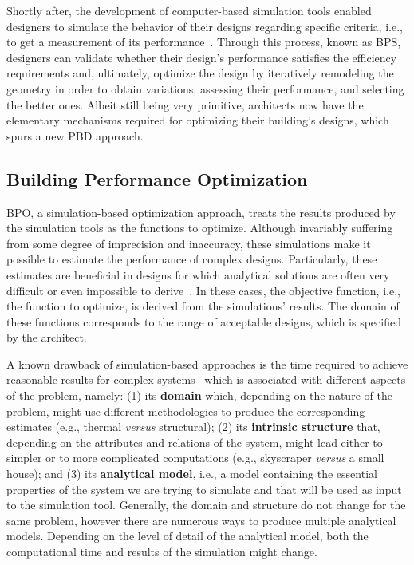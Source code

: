 Shortly after, the development of computer-based simulation tools enabled designers to simulate the behavior of their designs regarding specific criteria, i.e., to get a measurement of its performance~\cite{Malkawi2005}. Through this process, known as \ac{BPS}, designers can validate whether their design's performance satisfies the efficiency requirements and, ultimately, optimize the design by iteratively remodeling the geometry in order to obtain variations, assessing their performance, and selecting the better ones. Albeit still being very primitive, architects now have the elementary mechanisms required for optimizing their building's designs, which spurs a new \ac{PBD} approach.

\subsection{Building Performance Optimization}

	\ac{BPO}, a simulation-based optimization approach, treats the results produced by the simulation tools as the functions to optimize. Although invariably suffering from some degree of imprecision and inaccuracy, these simulations make it possible to estimate the performance of complex designs. Particularly, these estimates are beneficial in designs for which analytical solutions are often very difficult or even impossible to derive~\cite{Kolda2003}. In these cases, the objective function, i.e., the function to optimize, is derived from the simulations' results. The domain of these functions corresponds to the range of acceptable designs,  which is specified by the architect.

	A known drawback of simulation-based approaches is the time required to achieve reasonable results for complex systems~\cite{Law1991} which is associated with different aspects of the problem, namely: (1) its \textbf{domain} which, depending on the nature of the problem, might use different methodologies to produce the corresponding estimates (e.g., thermal \textit{versus} structural); (2) its \textbf{intrinsic structure} that, depending on the attributes and relations of the system, might lead either to simpler or to more complicated computations (e.g., skyscraper \textit{versus} a small house); and (3) its \textbf{analytical model}, i.e., a model containing the essential properties of the system we are trying to simulate and that will be used as input to the simulation tool. Generally, the domain and structure do not change for the same problem, however there are numerous ways to produce multiple analytical models. Depending on the level of detail of the analytical model, both the computational time and results of the simulation might change. 

